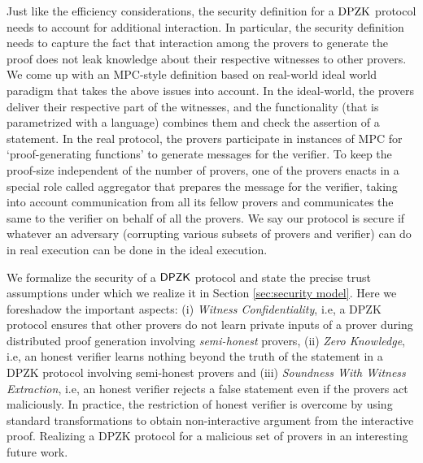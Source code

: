 
Just like the efficiency considerations, the security definition for a $\text{DPZK}$ protocol needs to account for additional interaction. 
In particular, the security definition needs to capture the fact that interaction among the provers to generate the proof does not 
leak knowledge about their respective witnesses to other provers. 
We come up with an MPC-style definition based on real-world ideal world paradigm \cite{Canetti00,Goldreich2001,Lindell17,CohenL14}  
that takes the above issues into account. In the ideal-world, the provers deliver their respective part of the witnesses, 
and the functionality (that is parametrized with a language) combines them and check the assertion of a statement. 
In the real protocol, the provers participate in instances of MPC for `proof-generating functions' to generate messages for the verifier. 
To keep the proof-size independent of the number of provers, one of the provers enacts in a special role called 
aggregator that prepares the message for the verifier, taking into account communication from all its fellow provers 
and communicates the same to the verifier on behalf of all the provers. We say our protocol is secure if whatever an 
adversary (corrupting various subsets of provers and verifier) can do in real execution can be done in the ideal execution. 


{
We formalize the security of a $\mathsf{DPZK}$ protocol and state the precise trust assumptions under which we realize it in Section \ref{sec:security model}.
Here we foreshadow the important aspects: (i) {\em Witness Confidentiality}, i.e, a DPZK protocol ensures that other provers do not learn private inputs of a prover during 
distributed proof generation involving {\em semi-honest} provers, 
(ii) {\em Zero Knowledge}, i.e, an honest verifier learns nothing beyond the truth of the statement 
in a DPZK protocol involving semi-honest provers and (iii) {\em Soundness With Witness Extraction}, i.e, an honest verifier rejects a false statement even if the provers act maliciously.
In practice, the restriction of honest verifier is overcome by using standard transformations to obtain non-interactive 
argument from the interactive proof. Realizing a DPZK protocol for a malicious set of provers in an interesting future work.
}


